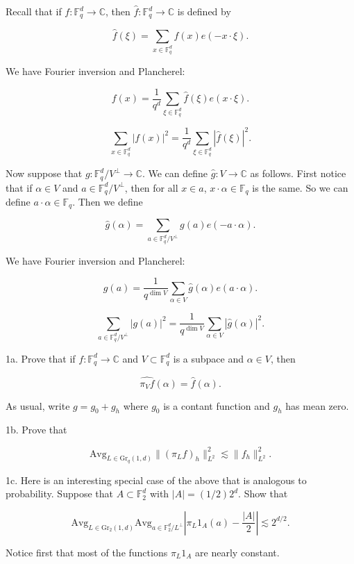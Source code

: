 \documentclass{amsart}
\newcommand{\FF}{\mathbb{F}}
\newcommand{\CC}{\mathbb{C}}
\newcommand{\Gr}{\textrm{Gr}}
\newcommand{\Avg}{\textrm{Avg}}
\begin{document}
Recall that if $f: \FF_q^d \rightarrow \CC$,  then $\hat f: \FF_q^d \rightarrow \CC$ is defined by

$$ \hat f(\xi) = \sum_{x \in \FF_q^d} f(x) e( - x \cdot \xi).$$

We have Fourier inversion and Plancherel:

$$ f(x) = \frac{1}{q^d} \sum_{\xi \in \FF_q^d} \hat f(\xi) e( x \cdot \xi). $$

$$ \sum_{x \in \FF_q^d} |f(x)|^2 = \frac{1}{q^d}  \sum_{\xi \in \FF_q^d} | \hat f(\xi)|^2. $$

Now suppose that $g: \FF_q^d / V^\perp \rightarrow \CC$.   We can define $\hat g: V \rightarrow \CC$ as follows.   First notice that if $\alpha \in V$ and $a \in \FF_q^d / V^\perp$,  then for all $x \in a$,  $x \cdot \alpha \in \FF_q$ is the same.   So we can define $a \cdot \alpha \in \FF_q$.   Then we define

$$ \hat g(\alpha) = \sum_{a \in \FF_q^d/ V^\perp} g(a) e( - a \cdot \alpha).$$

We have Fourier inversion and Plancherel:

$$ g(a) = \frac{1}{q^{\dim V}} \sum_{\alpha \in V} \hat g(\alpha) e( a \cdot \alpha). $$

$$ \sum_{a \in \FF_q^d / V^\perp} |g(a)|^2 = \frac{1}{q^{\dim V}}  \sum_{\alpha \in V} | \hat g(\alpha)|^2. $$

\vskip10pt

1a.  Prove that if $f: \FF_q^d \rightarrow \CC$ and $V \subset \FF_q^d$ is a subpace and $\alpha \in V$,  then

$$\widehat{\pi_V f}(\alpha) = \hat f(\alpha). $$

\vskip10pt

As usual,  write $g = g_0 + g_h$ where $g_0$ is a contant function and $g_h$ has mean zero.

\vskip10pt

1b.  Prove that 

$$ \Avg_{L \in \Gr_q(1,d)} \| (\pi_L f)_h \|_{L^2}^2 \lesssim \| f_h \|_{L^2}^2. $$

\vskip10pt

1c.  Here is an interesting special case of the above that is analogous to probability.   Suppose that $A \subset \FF_2^d$ with $|A| = (1/2) 2^d$.   Show that

$$ \Avg_{L \in \Gr_2(1,d)} \Avg_{a \in \FF_2^d / L^\perp} \left| \pi_L 1_A(a) - \frac{|A|}{2} \right| \lesssim 2^{d/2}. $$

Notice first that most of the functions $\pi_L 1_A$ are nearly constant.  
\end{document}

